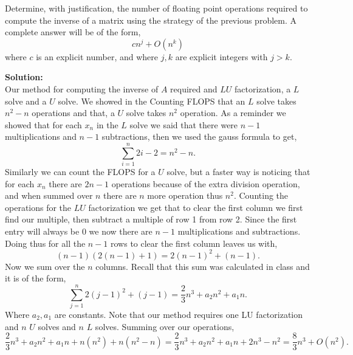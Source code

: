 \documentclass[12pt]{article}
\makeatletter
\theoremstyle{homework}
\newenvironment{exercise}[1]
{\def\@currentlabel{#1}\exercisecore}
{\endexercisecore}
\newcommand{\localhead}[1]{\par\smallskip\noindent\textbf{#1}\nobreak\\}%
\newcommand\solution{\localhead{Solution:}}
\makeatother
\begin{document}
\begin{exercise}{Supplemental 2} Determine, with justification, the number of floating point operations required to compute the
	inverse of a matrix using the strategy of the previous problem. A complete answer will be of the form,
	\begin{equation*}
		cn^j +O(n^k)
	\end{equation*}
	where $c$ is an explicit number, and where $j,k$ are explicit integers with $j>k$. \\

	\solution Our method for computing the inverse of $A$ required and $LU$ factorization, a $L$ solve and a $U$ solve. We showed in the Counting FLOPS that 
	an $L$ solve takes $n^2 - n$ operations and that, a $U$ solve takes $n^2$ operation. As a reminder we showed that for each $x_n$ in the $L$ solve we said that there were $n-1$ multiplications and $n-1$ subtractions,
	then we used the gauss formula to get,
	\begin{equation*}
		\sum_{i = 1}^n 2i - 2 = n^2 - n. 
	\end{equation*}  
	Similarly we can count the FLOPS for a $U$ solve, but a faster way is noticing that for each $x_n$ there are $2n - 1$ operations because of the extra division operation, and when summed over $n$ there are $n$ more operation thus $n^2$.
	Counting the operations for the $LU$ factorization we get that to clear the first column we first find our multiple, then subtract a multiple of row 1 from row 2. Since the first entry will always be 0 we now there are $n-1$ multiplications and subtractions.
	Doing thus for all the $n-1$ rows to clear the first column leaves us with,
	\begin{equation*}
		(n-1)(2(n-1)+1) = 2(n-1)^2+(n-1).
	\end{equation*} 
	Now we sum over the $n$ columns. Recall that this sum was calculated in class and it is of the form,
	\begin{equation*}
		\sum_{j = 1}^{n} 2(j - 1)^2 + (j - 1) = \dfrac{2}{3}n^3 + a_2n^2 + a_1n.
	\end{equation*}
	Where $a_2, a_1$ are constants. Note that our method requires one LU factorization and $n$ $U$ solves and $n$ $L$ solves. Summing over our operations,
	\begin{equation*}
		\dfrac{2}{3}n^3 + a_2n^2 + a_1n + n(n^2) + n(n^2 - n) = \dfrac{2}{3}n^3 + a_2n^2 + a_1n + 2n^3 - n^2 =  \dfrac{8}{3}n^3 + O(n^2).
	\end{equation*}

\end{exercise}
\end{document}
